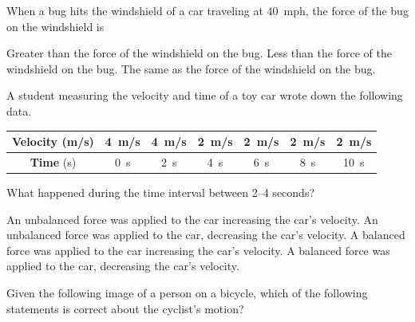 \documentclass[]{exam}
\begin{document}
\begin{questions}
\question 
When a bug hits the windshield of a car traveling at \SI{40}{mph}, the force of the bug on the windshield is

\begin{randomizechoices}[norandomize]
    \choice Greater than the force of the windshield on the bug.
    \choice Less than the force of the windshield on the bug.
    \correctchoice The same as the force of the windshield on the bug.
\end{randomizechoices}

\question
A student measuring the velocity and time of a toy car wrote down the following data.

\begin{center}
    \begin{tabular}{|c|c|c|c|c|c|c|}
        \hline
        \textbf{Velocity} (m/s) & \SI{4}{m/s} &  \SI{4}{m/s} & \SI{2}{m/s} & \SI{2}{m/s} & \SI{2}{m/s} & \SI{2}{m/s} \\ \hline
        \textbf{Time} (s) & \SI{0}{s} & \SI{2}{s} & \SI{4}{s} & \SI{6}{s} & \SI{8}{s} & \SI{10}{s} \\
        \hline
    \end{tabular}
\end{center}

What happened during the time interval between 2--4 seconds?

\begin{randomizechoices}[norandomize]
    \choice An unbalanced force was applied to the car increasing the car’s velocity.
    \correctchoice An unbalanced force was applied to the car, decreasing the car’s velocity.
    \choice A balanced force was applied to the car increasing the car’s velocity.
    \choice A balanced force was applied to the car, decreasing the car’s velocity.   
\end{randomizechoices}


\question 
Given the following image of a person on a bicycle, which of the following statements is correct about the cyclist’s motion?


\end{questions}
\end{document}
